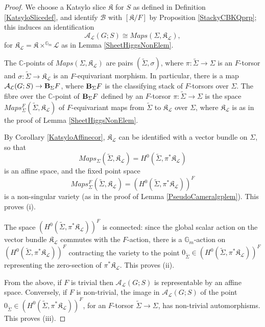 \documentclass{amsart}
\theoremstyle{remark}
\numberwithin{theorem}{section}
\numberwithin{equation}{section}
\begin{document}
\begin{proof} 
We choose a Katsylo slice $\mathfrak{K}$ for $S$ as defined in Definition \ref{KatsyloSlicedef}, and identify $\mathcal B$ with $[\mathfrak{K}/F]$ by Proposition \ref{StackyCBKQprp}; this induces an identification 
\begin{equation}\label{SHitchinBaseProps2eqn}
    \mathcal A_\mathcal L(G;S) \cong Maps(\Sigma,\mathfrak{K}_\mathcal{L}),
\end{equation}
for $\mathfrak{K}_\mathcal{L} = \mathfrak{K} \times^{\mathbb{G}_m}\mathcal L$ as in Lemma \ref{SheetHiggsNonElem}.

The $\mathbb{C}$-points of $Maps(\Sigma,\mathfrak{K}_\mathcal L)$ are pairs $(\tilde{\Sigma},\sigma)$, where $\pi:\tilde{\Sigma} \rightarrow \Sigma$ is an $F$-torsor and $\sigma:\tilde{\Sigma} \rightarrow \mathfrak{K}_\mathcal L$ is an $F$-equivariant morphism. In particular, there is a map $\mathcal A_\mathcal L(G;S) \rightarrow {\bf B}_{\Sigma}F$, where ${\bf B}_{\Sigma}F$ is the classifying stack of $F$-torsors over $\Sigma$. The fibre over the $\mathbb{C}$-point of ${\bf B}_{\Sigma}F$ defined by an $F$-torsor $\pi:\tilde{\Sigma} \rightarrow \Sigma$ is the space $Maps^F_{\Sigma}(\tilde{\Sigma},\mathfrak{K}_{\mathcal L})$ of $F$-equivariant maps from $\tilde{\Sigma}$ to $\mathfrak{K}_{\mathcal L}$ over $\Sigma$, where $\mathfrak{K}_\mathcal L$ is as in the proof of Lemma \ref{SheetHiggsNonElem}.

By Corollary \ref{KatsyloAffinecor}, $\mathfrak{K}_\mathcal L$ can be identified with a vector bundle on $\Sigma$, so that
$$Maps_{\Sigma}(\tilde{\Sigma},\mathfrak{K}_\mathcal L) = H^0(\tilde{\Sigma},\pi^*\mathfrak{K}_\mathcal L)$$ 
is an affine space, and the fixed point space 
$$Maps^F_{\Sigma}(\tilde{\Sigma},\mathfrak{K}_{\mathcal L})=(H^0(\tilde{\Sigma},\pi^*\mathfrak{K}_\mathcal L))^F$$
is a non-singular variety (as in the proof of Lemma \ref{PseudoCameralgplem}). This proves (i).

The space $(H^0(\tilde{\Sigma},\pi^*\mathfrak{K}_\mathcal L))^F$ is connected: since the global scalar action on the vector bundle $\mathfrak{K}_\mathcal L$ commutes with the $F$-action, there is a $\mathbb{G}_m$-action on $(H^0(\tilde{\Sigma},\pi^*\mathfrak{K}_\mathcal L))^F$ contracting the variety to the point $0_{\tilde{\Sigma}} \in (H^0(\tilde{\Sigma},\pi^*\mathfrak{K}_\mathcal L))^F$ representing the zero-section of $\pi^*\mathfrak{K}_\mathcal L$. This proves (ii).

From the above, if $F$ is trivial then $\mathcal A_\mathcal L(G;S)$ is representable by an affine space. Conversely, if $F$ is non-trivial, the image in $\mathcal A_\mathcal L(G;S)$ of the point $0_{\tilde{\Sigma}} \in (H^0(\tilde{\Sigma},\pi^*\mathfrak{K}_\mathcal L))^F$, for an $F$-torsor $\tilde{\Sigma} \rightarrow \Sigma$, has non-trivial automorphisms. This proves (iii).
\end{proof}
\end{document}
